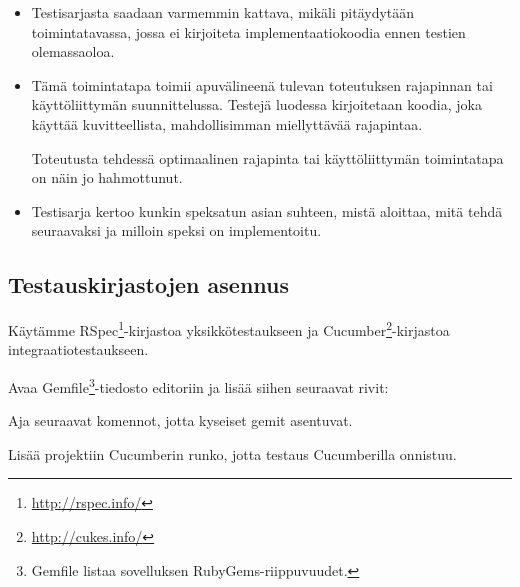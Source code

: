 \documentclass{article}
\newcommand{\en}[1]{\foreignlanguage{english}{#1}}
\begin{document}
\begin{itemize}
  \item
  Testisarjasta saadaan varmemmin kattava, mikäli pitäydytään toimintatavassa,
  jossa ei kirjoiteta implementaatiokoodia ennen testien olemassaoloa.

  \item
  Tämä toimintatapa toimii apuvälineenä tulevan toteutuksen rajapinnan tai
  käyttöliittymän suunnittelussa. Testejä luodessa kirjoitetaan koodia, joka
  käyttää kuvitteellista, mahdollisimman miellyttävää rajapintaa.

  Toteutusta tehdessä optimaalinen rajapinta tai käyttöliittymän toimintatapa
  on näin jo hahmottunut.

  \item
  Testisarja kertoo kunkin speksatun asian suhteen, mistä aloittaa, mitä tehdä
  seuraavaksi ja milloin speksi on implementoitu.
\end{itemize}

\subsection{Testauskirjastojen asennus}

Käytämme RSpec\footnote{\url{http://rspec.info/}}-kirjastoa yksikkötestaukseen
ja Cucumber\footnote{\url{http://cukes.info/}}-kirjastoa
integraatiotestaukseen.

\begin{samepage}
  Avaa Gemfile\footnote{Gemfile listaa sovelluksen
  RubyGems-riippuvuudet.}-tiedosto editoriin ja lisää siihen seuraavat rivit:

\end{samepage}

\begin{samepage}
  Aja seuraavat komennot, jotta kyseiset gemit asentuvat.

\end{samepage}

\begin{samepage}
  Lisää projektiin Cucumberin runko, jotta testaus Cucumberilla onnistuu.

\end{samepage}

\end{document}

